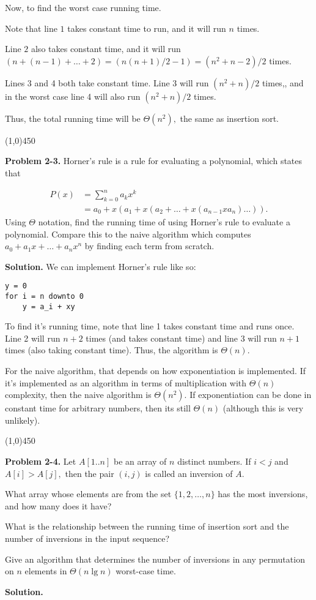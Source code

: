 \documentclass{article}
\newcommand{\prob}[2]
{\textbf{Problem #1.} #2

\textbf{Solution.}}
\newcommand{\bardiv}{\begin{center}
\line(1,0){450}
\end{center}}
\begin{document}
Now, to find the worst case running time.

Note that line $1$ takes constant time to run, and it will run $n$ times. 

Line $2$ also takes constant time, and it will run $(n + (n-1) + \dots + 2) = (n(n+1)/2 - 1) = (n^2 + n - 2)/2$ times.

Lines 3 and 4 both take constant time. Line 3 will run $(n^2 + n)/2$ times,, and in the worst case line 4 will also run $(n^2 + n)/2$ times. 

Thus, the total running time will be $\Theta(n^2),$ the same as insertion sort.

\bardiv

\prob{2-3}{Horner's rule is a rule for evaluating a polynomial, which states that

	\begin{align*}
		P(x) &= \sum_{k = 0}^n a_kx^k \\
		&= a_0 + x(a_1 + x(a_2 + \dots + x(a_{n-1} xa_n)\dots)).
	\end{align*}
Using $\Theta$ notation, find the running time of using Horner's rule to evaluate a polynomial. Compare this to the naive algorithm which computes $a_0 + a_1x + \dots + a_nx^n$ by finding each term from scratch.
}
We can implement Horner's rule like so:

\begin{lstlisting}
y = 0
for i = n downto 0
	y = a_i + xy
\end{lstlisting}

To find it's running time, note that line 1 takes constant time and runs once. Line 2 will run $n+2$ times (and takes constant time) and line 3 will run $n+1$ times (also taking constant time). Thus, the algorithm is $\Theta(n).$

For the naive algorithm, that depends on how exponentiation is implemented. If it's implemented as an algorithm in terms of multiplication with $\Theta(n)$ complexity, then the naive algorithm is $\Theta(n^2).$ If exponentiation can be done in constant time for arbitrary numbers, then its still $\Theta(n)$ (although this is very unlikely).

\bardiv

\prob{2-4}{Let $A[1..n]$ be an array of $n$ distinct numbers. If $i < j$ and $A[i] > A[j],$ then the pair $(i, j)$ is called an inversion of $A.$

	What array whose elements are from the set $\{1, 2, \dots, n\}$ has the most inversions, and how many does it have?

What is the relationship between the running time of insertion sort and the number of inversions in the input sequence?

Give an algorithm that determines the number of inversions in any permutation on $n$ elements in $\Theta(n \lg n)$ worst-case time.}
\end{document}
